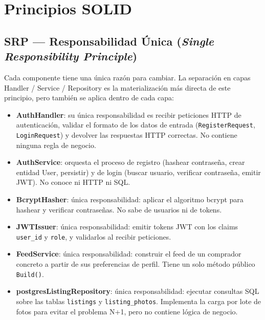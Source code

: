 \documentclass[12pt,a4paper]{article}
\begin{document}
\clearpage
\section{Principios SOLID}

\subsection{SRP --- Responsabilidad Única (\textit{Single Responsibility Principle})}

Cada componente tiene una única razón para cambiar. La separación en capas Handler / Service /
Repository es la materialización más directa de este principio, pero también se aplica dentro
de cada capa:

\begin{itemize}
  \item \textbf{AuthHandler}: su única responsabilidad es recibir peticiones HTTP de
        autenticación, validar el formato de los datos de entrada (\texttt{RegisterRequest},
        \texttt{LoginRequest}) y devolver las respuestas HTTP correctas. No contiene ninguna
        regla de negocio.
  \item \textbf{AuthService}: orquesta el proceso de registro (hashear contraseña, crear entidad
        User, persistir) y de login (buscar usuario, verificar contraseña, emitir JWT). No
        conoce ni HTTP ni SQL.
  \item \textbf{BcryptHasher}: única responsabilidad: aplicar el algoritmo bcrypt para hashear y
        verificar contraseñas. No sabe de usuarios ni de tokens.
  \item \textbf{JWTIssuer}: única responsabilidad: emitir tokens JWT con los claims
        \texttt{user\_id} y \texttt{role}, y validarlos al recibir peticiones.
  \item \textbf{FeedService}: única responsabilidad: construir el feed de un comprador concreto
        a partir de sus preferencias de perfil. Tiene un solo método público \texttt{Build()}.
  \item \textbf{postgresListingRepository}: única responsabilidad: ejecutar consultas SQL sobre
        las tablas \texttt{listings} y \texttt{listing\_photos}. Implementa la carga por lote
        de fotos para evitar el problema N+1, pero no contiene lógica de negocio.
\end{itemize}
\end{document}
